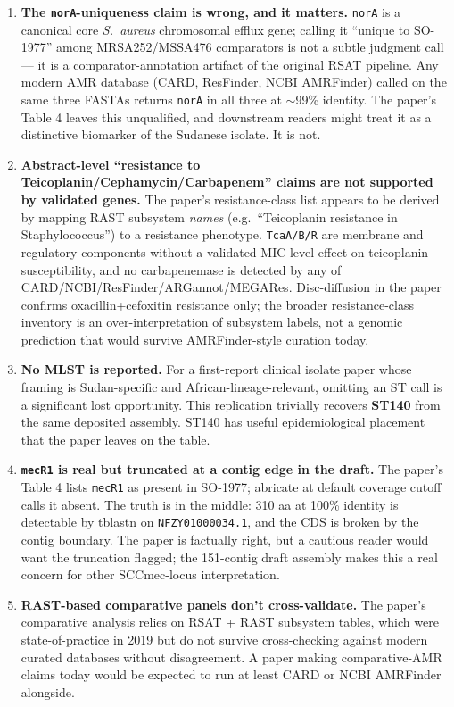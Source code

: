 \documentclass[11pt]{article}
\begin{document}
\begin{enumerate}[leftmargin=1.5em]
\item \textbf{The \texttt{norA}-uniqueness claim is wrong, and it matters.}
\texttt{norA} is a canonical core \emph{S.\ aureus} chromosomal efflux gene;
calling it ``unique to SO-1977'' among MRSA252/MSSA476 comparators is
not a subtle judgment call --- it is a comparator-annotation artifact
of the original RSAT pipeline. Any modern AMR database (CARD,
ResFinder, NCBI AMRFinder) called on the same three FASTAs returns
\texttt{norA} in all three at $\sim$99\% identity. The paper's Table 4 leaves
this unqualified, and downstream readers might treat it as a distinctive
biomarker of the Sudanese isolate. It is not.

\item \textbf{Abstract-level ``resistance to Teicoplanin/Cephamycin/Carbapenem''
claims are not supported by validated genes.} The paper's resistance-class
list appears to be derived by mapping RAST subsystem \emph{names} (e.g.\
``Teicoplanin resistance in Staphylococcus'') to a resistance phenotype.
\texttt{TcaA/B/R} are membrane and regulatory components without a
validated MIC-level effect on teicoplanin susceptibility, and no
carbapenemase is detected by any of CARD/NCBI/ResFinder/ARGannot/MEGARes.
Disc-diffusion in the paper confirms oxacillin+cefoxitin resistance
only; the broader resistance-class inventory is an over-interpretation
of subsystem labels, not a genomic prediction that would survive AMRFinder-style
curation today.

\item \textbf{No MLST is reported.} For a first-report clinical isolate paper
whose framing is Sudan-specific and African-lineage-relevant, omitting an ST
call is a significant lost opportunity. This replication trivially
recovers \textbf{ST140} from the same deposited assembly. ST140 has
useful epidemiological placement that the paper leaves on the table.

\item \textbf{\texttt{mecR1} is real but truncated at a contig edge in the
draft.} The paper's Table 4 lists \texttt{mecR1} as present in SO-1977;
abricate at default coverage cutoff calls it absent. The truth is in
the middle: 310 aa at 100\% identity is detectable by tblastn on
\texttt{NFZY01000034.1}, and the CDS is broken by the contig boundary.
The paper is factually right, but a cautious reader would want the
truncation flagged; the 151-contig draft assembly makes this a real
concern for other SCCmec-locus interpretation.

\item \textbf{RAST-based comparative panels don't cross-validate.}
The paper's comparative analysis relies on RSAT + RAST subsystem
tables, which were state-of-practice in 2019 but do not survive
cross-checking against modern curated databases without disagreement.
A paper making comparative-AMR claims today would be expected to run
at least CARD or NCBI AMRFinder alongside.
\end{enumerate}
\end{document}
